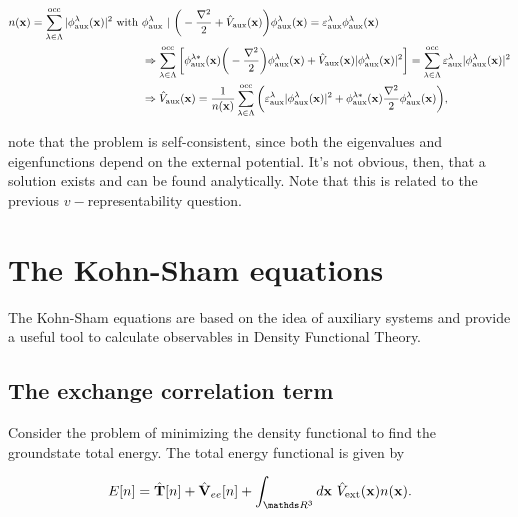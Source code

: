 \documentclass{homework}
\begin{document}
\begin{align*}
    n({\bf x}) = \sum_{\lambda \in \Lambda}^{\textnormal{occ}} |\phi_{\textnormal{aux}}^{\lambda}({\bf x}) |^2 \textnormal{ with } & \phi_{\textnormal{aux}}^{\lambda} \textnormal{ } | \textnormal{ } \bigg(- \frac{\nabla^2}{2} + \hat{V}_{\textnormal{aux}}({\bf x}) \bigg) \phi_{\textnormal{aux}}^{\lambda}({\bf x}) = \varepsilon_{\textnormal{aux}}^{\lambda}\phi_{\textnormal{aux}}^{\lambda}({\bf x}) \\
&\Rightarrow \sum_{\lambda \in \Lambda}^{\textnormal{occ}} \bigg[\phi_{\textnormal{aux}}^{\lambda*}({\bf x}) \bigg(-\frac{\nabla^2}{2}\bigg)\phi_{\textnormal{aux}}^{\lambda}({\bf x}) + \hat{V}_{\textnormal{aux}}({\bf x}) |\phi_{\textnormal{aux}}^{\lambda}({\bf x})|^2\bigg] = \sum_{\lambda \in \Lambda}^{\textnormal{occ}} \varepsilon_{\textnormal{aux}}^{\lambda}|\phi_{\textnormal{aux}}^{\lambda}({\bf x})|^2 \\
&\Rightarrow \hat{V}_{\textnormal{aux}}({\bf x}) = \frac{1}{ n({\bf x})} \sum_{\lambda \in \Lambda}^{\textnormal{occ}} \bigg(\varepsilon_{\textnormal{aux}}^{\lambda}|\phi_{\textnormal{aux}}^{\lambda}({\bf x})|^2 + \phi_{\textnormal{aux}}^{\lambda*}({\bf x}) \frac{\nabla^2}{2}\phi_{\textnormal{aux}}^{\lambda}({\bf x}) \bigg),
\end{align*}

note that the problem is self-consistent, since both the eigenvalues and eigenfunctions depend on the external potential. It's not obvious, then, that a solution exists and can be found analytically. Note that this is related to the previous $v-$representability question. 

\section{The Kohn-Sham equations}

The Kohn-Sham equations are based on the idea of auxiliary systems and provide a useful tool to calculate observables in Density Functional Theory. 

\subsection{The exchange correlation term}

Consider the problem of minimizing the density functional to find the groundstate total energy. The total energy functional is given by 

\begin{equation}
 E[n] = \hat{\bf T}[n] + \hat{\bf V}_{ee}[n] + \int_{\R^3} d{\bf x} \blanky \hat{V}_{\textnormal{ext}}({\bf x}) n({\bf x}).
 \label{Hohenberg-Kohn functional}
\end{equation}
\end{document}
